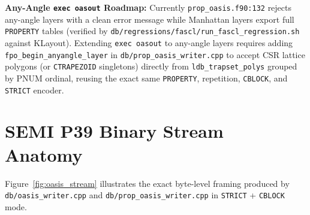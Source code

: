 \textbf{Any-Angle \texttt{exec oasout} Roadmap:} Currently \texttt{prop\_oasis.f90:132} rejects any-angle layers with a clean error message while Manhattan layers export full \texttt{PROPERTY} tables (verified by \texttt{db/regressions/fascl/run\_fascl\_regression.sh} against KLayout). Extending \texttt{exec oasout} to any-angle layers requires adding \texttt{fpo\_begin\_anyangle\_layer} in \texttt{db/prop\_oasis\_writer.cpp} to accept CSR lattice polygons (or \texttt{CTRAPEZOID} singletons) directly from \texttt{ldb\_trapset\_polys} grouped by PNUM ordinal, reusing the exact same \texttt{PROPERTY}, repetition, \texttt{CBLOCK}, and \texttt{STRICT} encoder.

\section{SEMI P39 Binary Stream Anatomy}

Figure~\ref{fig:oasis_stream} illustrates the exact byte-level framing produced by \texttt{db/oasis\_writer.cpp} and \texttt{db/prop\_oasis\_writer.cpp} in \texttt{STRICT} + \texttt{CBLOCK} mode.

